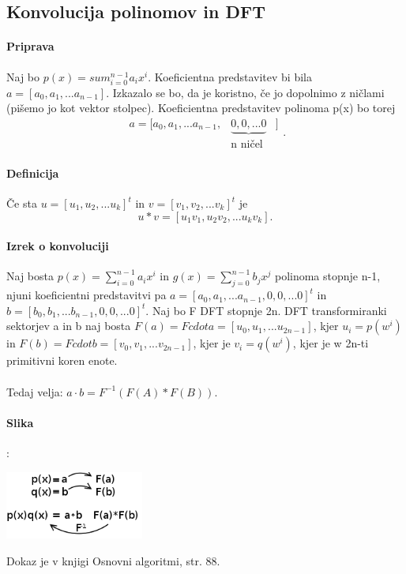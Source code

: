\documentclass[a4paper,10pt]{article}
\begin{document}
\subsection{Konvolucija polinomov in DFT}

\paragraph{Priprava}
Naj bo $p(x) = sum_{i=0}^{n-1} a_{i}x^{i}$. Koeficientna predstavitev bi bila $a = [a_{0}, a_{1},... a_{n-1}]$. Izkazalo se bo, da je koristno, \v ce jo dopolnimo z ni\v clami (pi\v semo jo kot vektor stolpec).
Koeficientna predstavitev polinoma p(x) bo torej
$$
\begin{array}{lll}
a = [a_{0}, a_{1},... a_{n-1}, & \underbrace{{0, 0, ... 0}} & ] \\
                               &    \mbox{n ni\v cel}       &
\end{array}
.
$$

\paragraph{Definicija}
\v Ce sta 
$u = [u_{1}, u_{2}, ... u_{k}]^{t}$
 in 
$v = [v_{1}, v_{2}, ... v_{k}]^{t}$
 je 
$$u * v = [u_{1}v_{1}, u_{2}v_{2}, ... u_{k}v_{k}]\mbox{.}$$

\paragraph{Izrek o konvoluciji}
Naj bosta $p(x) = \sum_{i=0}^{n-1} a_ix^i$ in $g(x) = \sum_{j=0}^{n-1} b_jx^j$ polinoma stopnje n-1, njuni koeficientni predstavitvi pa $a = [a_{0}, a_{1}, ... a_{n-1}, 0, 0,... 0]^{t}$ in $b = [b_{0}, b_{1}, ... b_{n-1}, 0, 0,... 0]^{t}$. Naj bo F DFT stopnje 2n. DFT transformiranki sektorjev a in b naj bosta
$F(a) = F cdot a = [u_{0}, u_{1}, ... u_{2n-1}] $, kjer $u_{i} = p(w^{i})$ in $F(b) = F cdot b = [v_{0}, v_{1}, ... v_{2n-1}] $, kjer je $v_{i} = q(w^{i})$, kjer je w 2n-ti primitivni koren enote.\\
\\
Tedaj velja: $a \cdot b = F^{-1}(F(A) * F(B))$.

\paragraph{Slika}:
	\begin{center}
	\includegraphics[width=4.55cm,height=2.25cm]{Slike/KonvolucijaSlika.png}
	\end{center}
Dokaz je v knjigi Osnovni algoritmi, str. 88.
\end{document}
